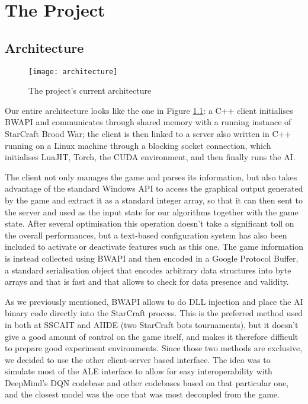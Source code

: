 \chapter{The Project}

\section{Architecture}

\begin{figure}[h]
    \centering
    \texttt{[image: architecture]}
    \caption{The project's current architecture}
    \label{fig:arch}
\end{figure}

Our entire architecture looks like the one in Figure \ref{fig:arch}: a C++
client initialises BWAPI and communicates through shared memory with a running
instance of StarCraft Brood War; the client is then linked to a server also
written in C++ running on a Linux machine through a blocking socket connection,
which initialises LuaJIT\cite{pall2008luajit}, Torch\cite{collobert2011torch},
the CUDA environment\cite{nvidia2008programming}, and then finally runs the AI.

The client not only manages the game and parses its information, but also takes
advantage of the standard Windows API to access the graphical output generated
by the game and extract it as a standard integer array, so that it can then sent
to the server and used as the input state for our algorithms together with the
game state. After several optimisation this operation doesn't take a significant
toll on the overall performances, but a text-based configuration system has also
been included to activate or deactivate features such as this one. The game
information is instead collected using BWAPI and then encoded in a Google
Protocol Buffer\cite{protobuf}, a standard serialisation object that encodes
arbitrary data structures into byte arrays and that is fast and that allows to
check for data presence and validity.

As we previously mentioned, BWAPI allows to do DLL injection and place the AI
binary code directly into the StarCraft process. This is the preferred method
used in both at SSCAIT and AIIDE (two StarCraft bots tournaments), but it
doesn't give a good amount of control on the game itself, and makes it therefore
difficult to prepare good experiment environments. Since those two methods are
exclusive, we decided to use the other client-server based interface. The idea
was to simulate most of the ALE interface to allow for easy interoperability
with DeepMind's DQN codebase and other codebases based on that particular one,
and the closest model was the one that was most decoupled from the game.

